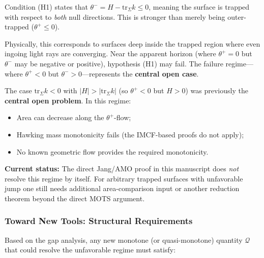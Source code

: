 \begin{remark}
Condition (H1) states that $\theta^- = H - \mathrm{tr}_\Sigma k \leq 0$, meaning the surface is trapped with respect to \emph{both} null directions. This is stronger than merely being outer-trapped ($\theta^+ \leq 0$). 

Physically, this corresponds to surfaces deep inside the trapped region where even ingoing light rays are converging. Near the apparent horizon (where $\theta^+ = 0$ but $\theta^-$ may be negative or positive), hypothesis (H1) may fail. The failure regime---where $\theta^+ < 0$ but $\theta^- > 0$---represents the \textbf{central open case}.
\end{remark}

\begin{remark}
\label{rem:unfavorable}
The case $\mathrm{tr}_\Sigma k < 0$ with $|H| > |\mathrm{tr}_\Sigma k|$ (so $\theta^+ < 0$ but $H > 0$) was previously the \textbf{central open problem}. In this regime:
\begin{itemize}
\item Area can decrease along the $\theta^+$-flow;
\item Hawking mass monotonicity fails (the IMCF-based proofs do not apply);
\item No known geometric flow provides the required monotonicity.
\end{itemize}
\textbf{Current status:} The direct Jang/AMO proof in this manuscript does \emph{not} resolve this regime by itself. For arbitrary trapped surfaces with unfavorable jump one still needs additional area-comparison input or another reduction theorem beyond the direct MOTS argument.
\end{remark}

\subsubsection{Toward New Tools: Structural Requirements}
\label{subsec:new-tools}

Based on the gap analysis, any new monotone (or quasi-monotone) quantity $\mathcal{Q}$ that could resolve the unfavorable regime must satisfy:

